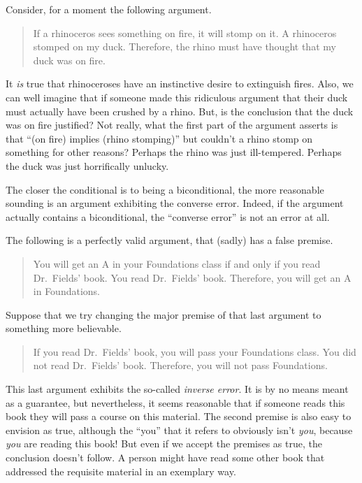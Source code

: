 Consider, for a moment the following argument.

\begin{quote}
If a rhinoceros sees something on fire, it will stomp on it. \newline
A rhinoceros stomped on my duck. \newline
Therefore, the rhino must have thought that my duck was on fire.
\end{quote} 

It \emph{is} true that rhinoceroses have an instinctive desire to extinguish 
fires.  Also, we can well imagine that if someone made this ridiculous 
argument that their duck must actually have been crushed by a rhino.  But, 
is the conclusion that the duck was on fire justified?  Not really, what 
the first part of the argument asserts is that ``(on fire) implies (rhino 
stomping)'' but couldn't a rhino stomp on something for other reasons?  
Perhaps the rhino was just ill-tempered.  Perhaps the duck was just 
horrifically unlucky.

The closer the conditional is to being a biconditional, the more reasonable 
sounding is an argument exhibiting the converse error.  Indeed, if the 
argument actually contains a biconditional, the ``converse error'' is not 
an error at all.

The following is a perfectly valid argument, that (sadly) has a false premise.

\begin{quote}
You will get an A in your Foundations class if and only if you 
read Dr.\ Fields' book.\newline
You read Dr.\ Fields' book. \newline
Therefore, you will get an A in Foundations.
\end{quote}

Suppose that we try changing the major premise of that last argument to
something more believable.

\begin{quote}
If you read Dr.\ Fields' book, you will pass your Foundations class. \newline
You did not read Dr.\ Fields' book. \newline
Therefore, you will not pass Foundations.
\end{quote}

This last argument exhibits the so-called \emph{inverse error}.  It is by 
no means meant as a guarantee, but nevertheless, it seems reasonable that 
if someone reads this book they will pass a course on this material.  
The second premise is also easy to envision as true, although the
``you'' that it refers to obviously isn't \emph{you}, because \emph{you} 
are reading this book!  But even if we accept the premises as true, the 
conclusion doesn't follow.  A person might have read some other book that 
addressed the requisite material in an exemplary way.


